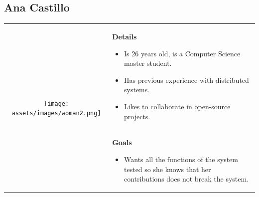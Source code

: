 \subsection*{Ana Castillo}
\begin{table}[h]
\begin{tabular}{c p{}}
\multirow{2}{*}{
      \texttt{[image: assets/images/woman2.png]}
} 
& 
\multicolumn{1}{p{0.7\textwidth}}{
\textbf{Details}
\begin{itemize}
	\item Is 26 years old, is a Computer Science master student.
	\item Has previous experience with distributed systems.
	\item Likes to collaborate in open-source projects.
\end{itemize}
} \\
&
\textbf{Goals} 
\begin{itemize}
	\item Wants all the functions of the system tested so she knows that her contributions does not break the system.
\end{itemize}   
\end{tabular}
\end{table}


